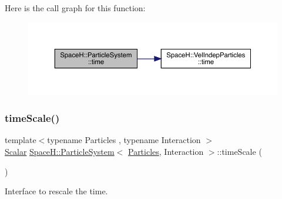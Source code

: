 Here is the call graph for this function\+:
\nopagebreak
\begin{figure}[H]
\begin{center}
\leavevmode
\includegraphics[width=350pt]{class_space_h_1_1_particle_system_a3c4c4ef7509d5c19d565ffad4bf5286a_cgraph}
\end{center}
\end{figure}
\mbox{\label{class_space_h_1_1_particle_system_a48745701be46a42213d9b35c599bb10a}} 
\subsubsection{\texorpdfstring{time\+Scale()}{timeScale()}}
{\footnotesize\ttfamily template$<$typename Particles , typename Interaction $>$ \\
\mbox{\hyperlink{class_space_h_1_1_particle_system_a522770dcfaf8b29aed35ea9348185a34}{Scalar}} \mbox{\hyperlink{class_space_h_1_1_particle_system}{Space\+H\+::\+Particle\+System}}$<$ \mbox{\hyperlink{struct_space_h_1_1_particles}{Particles}}, Interaction $>$\+::time\+Scale (\begin{DoxyParamCaption}{ }\end{DoxyParamCaption})\hspace{0.3cm}{\ttfamily [inline]}}



Interface to rescale the time. 

